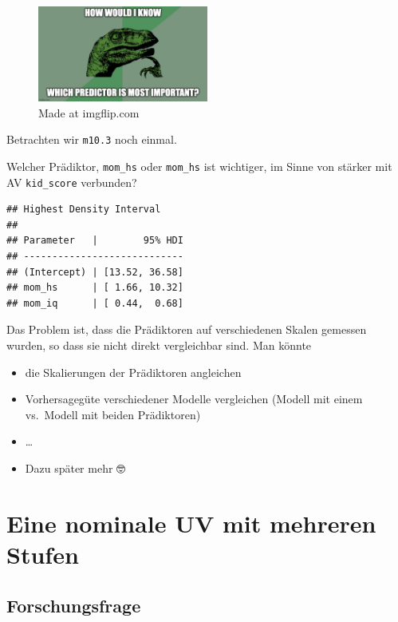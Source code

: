 \documentclass[
  a4paper,
  DIV=11]{scrreprt}
\providecommand{\tightlist}{%
  \setlength{\itemsep}{0pt}\setlength{\parskip}{0pt}}\usepackage{longtable,booktabs,array}
\theoremstyle{definition}
\theoremstyle{remark}
\begin{document}
\begin{figure}

{\centering \includegraphics[width=0.5\textwidth,height=\textheight]{./img/5sps62.jpg}

}

\caption{Made at imgflip.com}

\end{figure}

Betrachten wir \texttt{m10.3} noch einmal.

Welcher Prädiktor, \texttt{mom\_hs} oder \texttt{mom\_hs} ist wichtiger,
im Sinne von stärker mit AV \texttt{kid\_score} verbunden?

\begin{verbatim}
## Highest Density Interval
## 
## Parameter   |        95% HDI
## ----------------------------
## (Intercept) | [13.52, 36.58]
## mom_hs      | [ 1.66, 10.32]
## mom_iq      | [ 0.44,  0.68]
\end{verbatim}

Das Problem ist, dass die Prädiktoren auf verschiedenen Skalen gemessen
wurden, so dass sie nicht direkt vergleichbar sind. Man könnte

\begin{itemize}
\tightlist
\item
  die Skalierungen der Prädiktoren angleichen
\item
  Vorhersagegüte verschiedener Modelle vergleichen (Modell mit einem
  vs.~Modell mit beiden Prädiktoren)
\item
  \ldots{}
\item
  Dazu später mehr 🤓
\end{itemize}

\hypertarget{eine-nominale-uv-mit-mehreren-stufen}{%
\section{Eine nominale UV mit mehreren
Stufen}\label{eine-nominale-uv-mit-mehreren-stufen}}

\hypertarget{forschungsfrage-2}{%
\subsection{Forschungsfrage}\label{forschungsfrage-2}}
\end{document}
